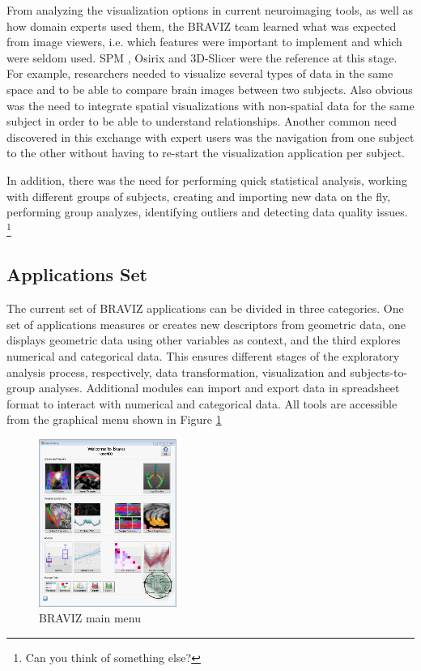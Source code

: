 \documentclass[twocolumn]{svjour3}
\begin{document}
From analyzing the visualization options in current neuroimaging tools, as well as how domain experts used them, the BRAVIZ team learned what was expected from image viewers, i.e. which features were important to implement and which were seldom used. SPM \cite{friston_statistical_2007}, Osirix \cite{rosset_osirix:_2004} and 3D-Slicer \cite{fedorov_3d_2012} were the reference at this stage. For example, researchers needed to visualize several types of data in the same space and to be able to compare brain images between two subjects. Also obvious was the need to integrate spatial visualizations with non-spatial data for the same subject in order to be able to understand relationships. Another common need discovered in this exchange with expert users was the navigation from one subject to the other without having to re-start the visualization application per subject. 

In addition, there was the need for performing quick statistical analysis, working with different groups of subjects, creating and importing new data on the fly, performing group analyzes, identifying outliers and detecting data quality issues. \footnote{Can you think of something else?}



\subsection{Applications Set}


The current set of BRAVIZ applications can be divided in three categories. One set of applications measures or creates new descriptors from geometric data, one displays geometric data using other variables as context, and the third explores numerical and categorical data. This ensures different stages of the exploratory analysis process, respectively, data transformation, visualization and subjects-to-group analyses. Additional modules can import and export data in spreadsheet format to interact with numerical and categorical data. All tools  are accessible from the graphical menu shown in Figure \ref{fig_menu}

\begin{figure}
\begin{center}
\includegraphics[width=0.4\textwidth]{braviz_menu}
\end{center}
 \caption{\label{fig_menu} BRAVIZ main menu }
\end{figure}
\end{document}
